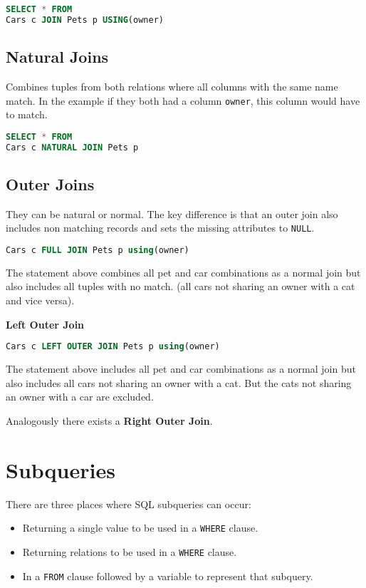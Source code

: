 \documentclass{article}
\renewcommand{\t}[1]{\texttt{#1}}
\begin{document}
\begin{lstlisting}[language=SQL]
SELECT * FROM 
Cars c JOIN Pets p USING(owner)
\end{lstlisting}

\subsection*{Natural Joins}
Combines tuples from both relations where all columns with the same name match. In the example if they both had a column \t{owner}, this column would have to match.
\begin{lstlisting}[language=SQL]
SELECT * FROM 
Cars c NATURAL JOIN Pets p
\end{lstlisting}


\subsection*{Outer Joins}

They can be natural or normal. The key difference is that an outer join also includes non matching records and sets the missing attributes to \t{NULL}.
\begin{lstlisting}[language=SQL]
Cars c FULL JOIN Pets p using(owner)
\end{lstlisting}
The statement above combines all pet and car combinations as a normal join but also includes all tuples with no match. (all cars not sharing an owner with a cat and vice versa).

\textbf{Left Outer Join}
\begin{lstlisting}[language=SQL]
Cars c LEFT OUTER JOIN Pets p using(owner)
\end{lstlisting}
The statement above includes all pet and car combinations as a normal join but also includes all cars not sharing an owner with a cat. But the cats not sharing an owner with a car are excluded.

Analogously there exists a \textbf{Right Outer Join}.

\section*{Subqueries}

There are three places where SQL subqueries can occur:

\begin{itemize}
	\item Returning a single value to be used in a \t{WHERE} clause.
	\item Returning relations to be used in a \t{WHERE} clause.
	\item In a \t{FROM} clause followed by a variable to represent that subquery.
\end{itemize}
\end{document}
